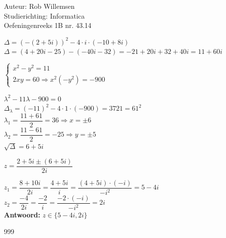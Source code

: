 \documentclass[a4paper]{article}
\begin{document}
\noindent \large Auteur: Rob Willemsen \\
\noindent \large Studierichting: Informatica\\
\noindent \large Oefeningenreeks 1B nr. 43.14\\

\medskip

\normalsize

$\Delta = (-(2+5i))^2 - 4 \cdot i \cdot (-10+8i)$ \\

$\Delta = (4 + 20i - 25) - (-40i - 32) = -21 + 20i + 32 + 40i = 11 + 60i$ \\

\medskip

$\left\{
    \begin{array}{l}
        x^2 - y^2 = 11\\
        2xy = 60 \Rightarrow x^2(-y^2) = -900
    \end{array}
  \right.$ \\

\medskip

$\lambda^2 - 11\lambda - 900 = 0$ \\

$\Delta_{\lambda} = (-11)^2 - 4 \cdot 1 \cdot (-900) = 3721 = 61^2$ \\

$\lambda_{1} = \dfrac{11 + 61}{2} = 36 \Rightarrow x = \pm 6$ \\

$\lambda_{2} = \dfrac{11 - 61}{2} = -25 \Rightarrow y = \pm 5$ \\

$\sqrt{\Delta} = 6 + 5i$ \\

\medskip

$z = \dfrac{2+5i \pm (6+5i)}{2i}$ \\

\medskip

$z_1 = \dfrac{8+10i}{2i} = \dfrac{4+5i}{i} = \dfrac{(4+5i) \cdot (-i)}{-i^2} = 5 - 4i$ \\

$z_2 = \dfrac{-4}{2i} = \dfrac{-2}{i} = \dfrac{-2 \cdot (-i)}{-i^2} = 2i$ \\

\textbf{Antwoord:} $z \in \{5-4i, 2i\}$

\begin{thebibliography}{999}
\end{thebibliography}
\end{document}
